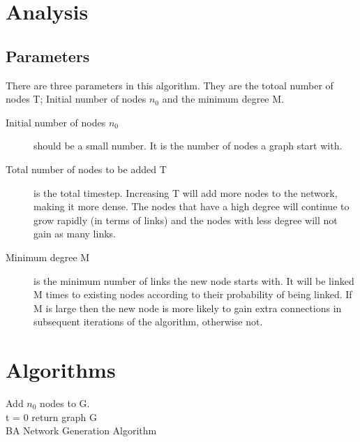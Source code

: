 \documentclass[a0,final]{a0poster}
\begin{document}
\begin{multicols}{3}
\section{Analysis}
\subsection{Parameters}
There are three parameters in this algorithm. They are the totoal number of nodes T;  Initial number of nodes $n_0$ and the minimum degree M. \\
\begin{description} 
  \item[Initial number of nodes $n_0$] should be a small number. It is the number of nodes a graph start with.
  \item[Total number of nodes to be added T] is the total timestep. Increasing T will add more nodes to the network, making it more dense. The nodes that have a high degree will continue to grow rapidly (in terms of links) and the nodes with less degree will not gain as many links.
  \item[Minimum degree M] is the minimum number of links the new node starts with. It will be linked M times to existing nodes according to their probability of being linked. If M is large then the new node is more likely to gain extra connections in subsequent iterations of the algorithm, otherwise not.
\end{description}

\columnbreak

\section*{Algorithms}


\begin{algorithm}[H]
Add $n_0$ nodes to G.\\
t = 0
return graph G\\
 \caption{BA Network Generation Algorithm}
\end{algorithm}



\end{multicols}
\end{document}
